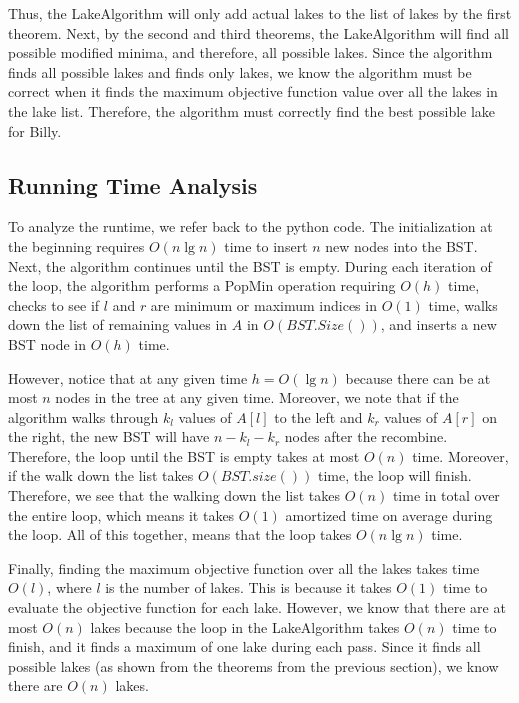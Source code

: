 \documentclass{6046}
\begin{document}
Thus, the LakeAlgorithm will only add actual lakes to the list of lakes by the first theorem. Next, by the second and third theorems, the LakeAlgorithm will find all possible modified minima, and therefore, all possible lakes. Since the algorithm finds all possible lakes and finds only lakes, we know the algorithm must be correct when it finds the maximum objective function value over all the lakes in the lake list. Therefore, the algorithm must correctly find the best possible lake for Billy. 

\subsection*{Running Time Analysis}

To analyze the runtime, we refer back to the python code. The initialization at the beginning requires $O(n \lg n)$ time to insert $n$ new nodes into the BST. Next, the algorithm continues until the BST is empty. During each iteration of the loop, the algorithm performs a PopMin operation requiring $O(h)$ time, checks to see if $l$ and $r$ are minimum or maximum indices in $O(1)$ time, walks down the list of remaining values in $A$ in $O(BST.Size())$, and inserts a new BST node in $O(h)$ time. 

However, notice that at any given time $h = O(\lg n)$ because there can be at most $n$ nodes in the tree at any given time. Moreover, we note that if the algorithm walks through $k_l$ values of $A[l]$ to the left and $k_r$ values of $A[r]$ on the right, the new BST will have $n - k_l - k_r$ nodes after the recombine. Therefore, the loop until the BST is empty takes at most $O(n)$ time. Moreover, if the walk down the list takes $O(BST.size())$ time, the loop will finish. Therefore, we see that the walking down the list takes $O(n)$ time in total over the entire loop, which means it takes $O(1)$ amortized time on average during the loop. All of this together, means that the loop takes $O(n \lg n)$ time. 

Finally, finding the maximum objective function over all the lakes takes time $O(l)$, where $l$ is the number of lakes. This is because it takes $O(1)$ time to evaluate the objective function for each lake. However, we know that there are at most $O(n)$ lakes because the loop in the LakeAlgorithm takes $O(n)$ time to finish, and it finds a maximum of one lake during each pass. Since it finds all possible lakes (as shown from the theorems from the previous section), we know there are $O(n)$ lakes. 
\end{document}
